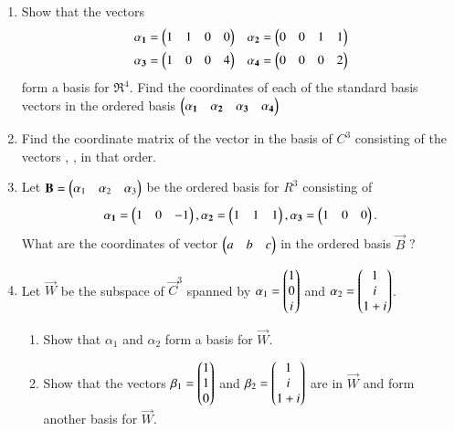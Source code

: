 \renewcommand{\theequation}{\theenumi}
\renewcommand{\thefigure}{\theenumi}
\begin{enumerate}[label=\thesubsection.\arabic*.,ref=\thesubsection.\theenumi]
%
\item Show that the vectors 
\begin{align}
& \mathbf{\alpha_1} = \begin{pmatrix}1 & 1 & 0 & 0\end{pmatrix} & \mathbf{\alpha_2} = \begin{pmatrix}0 & 0 & 1 & 1\end{pmatrix} \\
& \mathbf{\alpha_3} = \begin{pmatrix}1 & 0 & 0 & 4\end{pmatrix} & \mathbf{\alpha_4} = \begin{pmatrix}0 & 0 & 0 & 2\end{pmatrix}
\end{align}
form a basis for $\Re^4$. Find the coordinates of each of the standard basis vectors
in the ordered basis $\begin{pmatrix}\mathbf{\alpha_1} &  \mathbf{\alpha_2} & \mathbf{\alpha_3} & \mathbf{\alpha_4}\end{pmatrix}$
%
\\
\solution

%
\item Find the coordinate matrix of the vector  in the basis of $C^{3}$ consisting of the vectors  ,  ,  in that order.
%
\\
\solution

%
\item 
Let $\mathbf{B} = \begin{pmatrix}\alpha_1&\alpha_2&\alpha_3\end{pmatrix}$ be the ordered basis for $R^3$ consisting of 
$$\mathbf{\alpha_1} = \begin{pmatrix}1&0&-1\end{pmatrix}, \mathbf{\alpha_2} = \begin{pmatrix}1&1&1\end{pmatrix}, \mathbf{\alpha_3} = \begin{pmatrix}1&0&0\end{pmatrix}.$$
What are the coordinates of vector $\begin{pmatrix}a&b&c\end{pmatrix}$ in the ordered basis $\vec{B}$ ?
%
\\
\solution

\item Let $\vec{W}$ be the subspace of $\vec{C}^3$ spanned by 
$\alpha_1=\begin{pmatrix}1\\0\\i\end{pmatrix}$ and $\alpha_2=\begin{pmatrix}1\\i\\1+i\end{pmatrix}$.
\begin{enumerate}[label=\emph{\alph*)}]
	\item Show that $\alpha_1$ and $\alpha_2$ form a basis for $\vec{W}$.\\
	\item Show that the vectors $\beta_1=\begin{pmatrix}1\\1\\0\end{pmatrix}$ and 
		$\beta_2=\begin{pmatrix}1\\i\\1+i\end{pmatrix}$ are in $\vec{W}$ and form another
		basis for $\vec{W}$. \\

\end{enumerate}
\end{enumerate}

